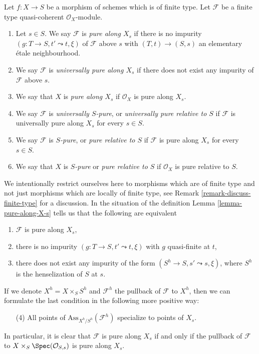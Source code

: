 \begin{definition}
\label{definition-pure}
Let $f : X \to S$ be a morphism of schemes which is of finite type.
Let $\mathcal{F}$ be a finite type quasi-coherent $\mathcal{O}_X$-module.
\begin{enumerate}
\item Let $s \in S$. We say $\mathcal{F}$ is {\it pure along $X_s$}
if there is no impurity $(g : T \to S, t' \leadsto t, \xi)$
of $\mathcal{F}$ above $s$ with $(T, t) \to (S, s)$ an
elementary \'etale neighbourhood.
\item We say $\mathcal{F}$ is {\it universally pure along $X_s$}
if there does not exist any impurity of $\mathcal{F}$ above $s$.
\item We say that $X$ is {\it pure along $X_s$} if $\mathcal{O}_X$
is pure along $X_s$.
\item We say $\mathcal{F}$ is {\it universally $S$-pure}, or
{\it universally pure relative to $S$} if $\mathcal{F}$ is universally
pure along $X_s$ for every $s \in S$.
\item We say $\mathcal{F}$ is {\it $S$-pure}, or
{\it pure relative to $S$} if $\mathcal{F}$ is pure along $X_s$
for every $s \in S$.
\item We say that $X$ is {\it $S$-pure} or {\it pure relative to $S$}
if $\mathcal{O}_X$ is pure relative to $S$.
\end{enumerate}
\end{definition}

\noindent
We intentionally restrict ourselves here to morphisms which are
of finite type and not just morphisms which are locally of
finite type, see
Remark \ref{remark-discuss-finite-type}
for a discussion. In the situation of the definition
Lemma \ref{lemma-pure-along-X-s}
tells us that the following are equivalent
\begin{enumerate}
\item $\mathcal{F}$ is pure along $X_s$,
\item there is no impurity $(g : T \to S, t' \leadsto t, \xi)$ with $g$
quasi-finite at $t$,
\item there does not exist any impurity of the form
$(S^h \to S, s' \leadsto s, \xi)$, where $S^h$ is the henselization
of $S$ at $s$.
\end{enumerate}
If we denote $X^h = X \times_S S^h$ and $\mathcal{F}^h$ the pullback
of $\mathcal{F}$ to $X^h$, then we can formulate the last condition
in the following more positive way:
\begin{enumerate}
\item[(4)] All points of $\text{Ass}_{X^h/S^h}(\mathcal{F}^h)$ specialize
to points of $X_s$.
\end{enumerate}
In particular, it is clear that $\mathcal{F}$ is pure along $X_s$
if and only if the pullback of $\mathcal{F}$ to
$X \times_S \Spec(\mathcal{O}_{S, s})$ is pure along $X_s$.

